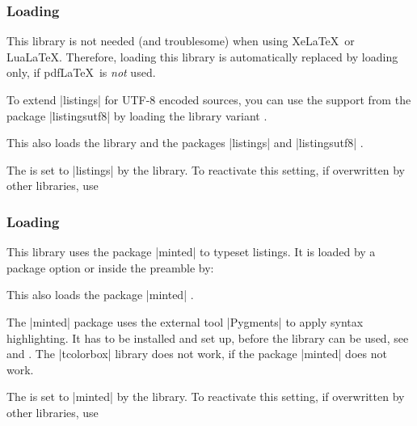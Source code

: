 \subsubsection{Loading }
\begin{marker}
This library is not needed (and troublesome) when using Xe\LaTeX\ or Lua\LaTeX.
Therefore, loading this library is automatically replaced by loading
 only, if pdf\LaTeX\ is \emph{not} used.
\end{marker}
To extend |listings| for UTF-8 encoded sources, you can use the support from
the package |listingsutf8| \cite{oberdiek:listingsutf8} by loading the library
variant .
\begin{dispListing}
\end{dispListing}
This also loads the library 
and the packages |listings| \cite{hoffmann:listings}
and |listingsutf8| \cite{oberdiek:listingsutf8}.

The  is set to |listings| by the library.
To reactivate this setting, if overwritten by other libraries, use
\begin{dispListing}
\end{dispListing}


\clearpage
\subsubsection{Loading }
This library uses the package |minted| \cite{poore:minted} to typeset
listings. It is loaded by a package option or inside the preamble by:
\begin{dispListing}
\end{dispListing}
This also loads the package |minted| \cite{poore:minted}.

\begin{marker}
The |minted| package uses the external tool |Pygments| \cite{pygments:web}
to apply syntax highlighting. It has to be installed and set up, before the
library can be used, see \cite{poore:minted} and \cite{pygments:web}.
The |tcolorbox| library  does not work, if the package
|minted| \cite{poore:minted} does not work.
\end{marker}

The  is set to |minted| by the library.
To reactivate this setting, if overwritten by other libraries, use
\begin{dispListing}
\end{dispListing}


